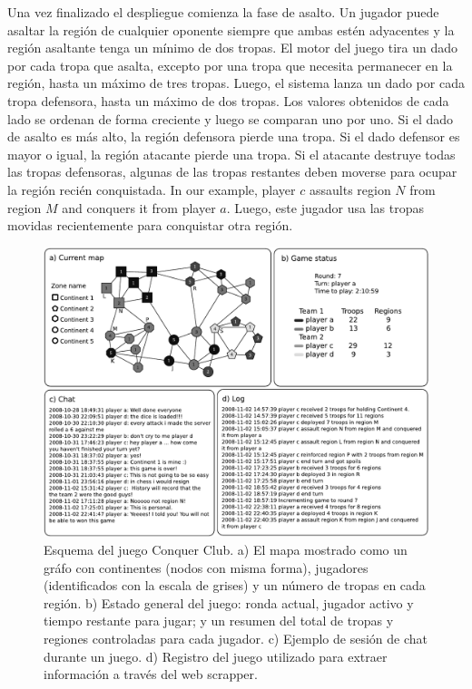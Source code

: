\documentclass[a4paper,11pt]{book}
\theoremstyle{definition}
\begin{document}
Una vez finalizado el despliegue comienza la fase de asalto.
%
Un jugador puede asaltar la región de cualquier oponente siempre que ambas estén adyacentes y la región asaltante tenga un mínimo de dos tropas.
%
El motor del juego tira un dado por cada tropa que asalta, excepto por una tropa que necesita permanecer en la región, hasta un máximo de tres tropas.
%
Luego, el sistema lanza un dado por cada tropa defensora, hasta un máximo de dos tropas.
%
Los valores obtenidos de cada lado se ordenan de forma creciente y luego se comparan uno por uno.
%
Si el dado de asalto es más alto, la región defensora pierde una tropa.
%
Si el dado defensor es mayor o igual, la región atacante pierde una tropa.
%
Si el atacante destruye todas las tropas defensoras, algunas de las tropas restantes deben moverse para ocupar la región recién conquistada.
%
In our example, player $c$ assaults region $N$ from region $M$ and conquers it from player $a$.
%
Luego, este jugador usa las tropas movidas recientemente para conquistar otra región.

\begin{figure}[ht!]
    \centering
    \includegraphics[width=0.8\linewidth]{figures/Fig5}
    \caption{
    Esquema del juego Conquer Club. a) El mapa mostrado como un gráfo con continentes (nodos con misma forma), jugadores (identificados con la escala de grises) y un número de tropas en cada región.
    b) Estado general del juego: ronda actual, jugador activo y tiempo restante para jugar; y un resumen del total de tropas y regiones controladas para cada jugador.
    c) Ejemplo de sesión de chat durante un juego.
    d) Registro del juego utilizado para extraer información a través del web scrapper.
    }
    \label{conquerImage}
\end{figure}
\end{document}
